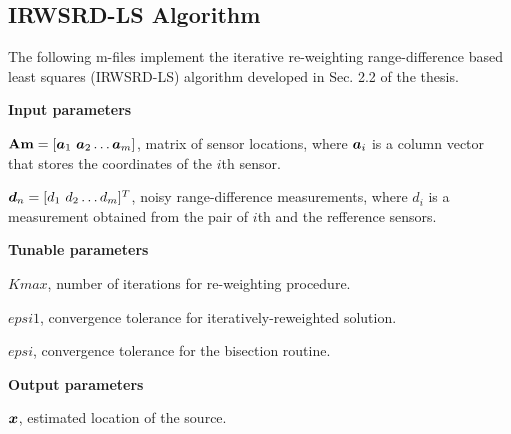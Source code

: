 \subsection{IRWSRD-LS Algorithm}

The following m-files implement the iterative re-weighting range-difference based least squares (IRWSRD-LS) algorithm developed in Sec. 2.2 of the thesis. 

\phantom{m}

\noindent
\textbf{Input parameters}

\noindent
$\mbox{\textbf{Am}} = [\mbox{\boldmath$a$}_1 \ \mbox{\boldmath$a$}_2 \ldots \mbox{\boldmath$a$}_m]$, matrix of sensor locations, where $\mbox{\boldmath$a$}_i$ is a column vector that stores the coordinates of the $i$th sensor.

\noindent
$\mbox{\boldmath$d$}_n = [d_1 \ d_2 \ldots d_m]^T$, noisy range-difference measurements, where $d_i$ is a measurement obtained from the pair of $i$th and the refference sensors.

\noindent
\textbf{Tunable parameters}

\noindent
$Kmax$, number of iterations for re-weighting procedure.

\noindent
$epsi1$, convergence tolerance for iteratively-reweighted solution.

\noindent
$epsi$, convergence tolerance for the bisection routine.

\noindent
\textbf{Output parameters}

\noindent
$\mbox{\boldmath$x$}$, estimated location of the source.

\phantom{m}

